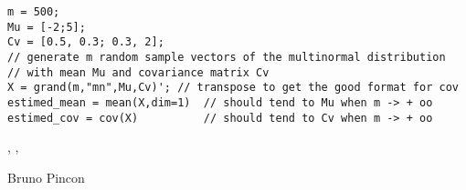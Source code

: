 \begin{examples}
\begin{Verbatim}
m = 500;
Mu = [-2;5];
Cv = [0.5, 0.3; 0.3, 2];
// generate m random sample vectors of the multinormal distribution
// with mean Mu and covariance matrix Cv 
X = grand(m,"mn",Mu,Cv)'; // transpose to get the good format for cov
estimed_mean = mean(X,dim=1)  // should tend to Mu when m -> + oo
estimed_cov = cov(X)          // should tend to Cv when m -> + oo
\end{Verbatim}
\end{examples}

\begin{manseealso}
  , , 
\end{manseealso}

\begin{authors}
  Bruno Pincon
\end{authors}
